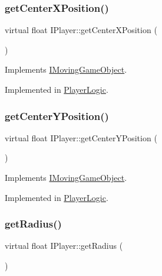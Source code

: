 \subsubsection{\texorpdfstring{get\+Center\+X\+Position()}{getCenterXPosition()}}
{\footnotesize\ttfamily virtual float I\+Player\+::get\+Center\+X\+Position (\begin{DoxyParamCaption}{ }\end{DoxyParamCaption})\hspace{0.3cm}{\ttfamily [pure virtual]}}



Implements \hyperlink{class_i_moving_game_object_ae4e6c21094ef1e2db32729270c8a7999}{I\+Moving\+Game\+Object}.



Implemented in \hyperlink{class_player_logic_a6bdec8d007701c16a3cbb87e7fdfe0e6}{Player\+Logic}.

\mbox{\label{class_i_player_a6c5a2ec396245f91bee3e00ab089d57e}} 
\subsubsection{\texorpdfstring{get\+Center\+Y\+Position()}{getCenterYPosition()}}
{\footnotesize\ttfamily virtual float I\+Player\+::get\+Center\+Y\+Position (\begin{DoxyParamCaption}{ }\end{DoxyParamCaption})\hspace{0.3cm}{\ttfamily [pure virtual]}}



Implements \hyperlink{class_i_moving_game_object_a075f69d69fd38dc02a0ec3c7b1cb0534}{I\+Moving\+Game\+Object}.



Implemented in \hyperlink{class_player_logic_ad7b9048aee0c7b58443055f37f871537}{Player\+Logic}.

\mbox{\label{class_i_player_a240460b3baeee74029f1fc407493d121}} 
\subsubsection{\texorpdfstring{get\+Radius()}{getRadius()}}
{\footnotesize\ttfamily virtual float I\+Player\+::get\+Radius (\begin{DoxyParamCaption}{ }\end{DoxyParamCaption})\hspace{0.3cm}{\ttfamily [pure virtual]}}



